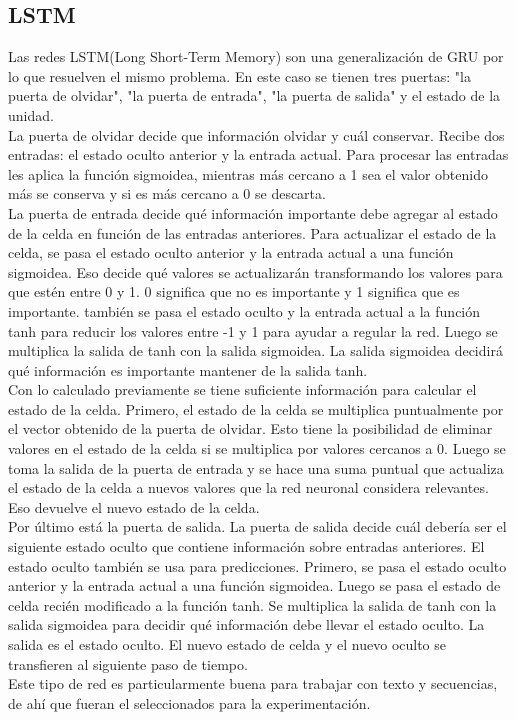 \subsection{LSTM}
Las redes LSTM(Long Short-Term Memory) son una generalización de GRU por lo que resuelven el mismo problema. En este caso se tienen tres puertas: "la puerta de olvidar", "la puerta de entrada", "la puerta de salida" y el estado de la unidad.\\
La puerta de olvidar decide que información olvidar y cuál conservar. Recibe dos entradas: el estado oculto anterior y la entrada actual. Para procesar las entradas les aplica la función sigmoidea, mientras más cercano a 1 sea el valor obtenido más se conserva y si es más cercano a 0 se descarta.\\
La puerta de entrada decide qué información importante debe agregar al estado de la celda en función de las entradas anteriores. Para actualizar el estado de la celda, se pasa el estado oculto anterior  y la entrada actual  a una función sigmoidea. Eso decide qué valores se actualizarán transformando los valores para que estén entre 0 y 1. 0 significa que no es importante y 1 significa que es importante. también se pasa el estado oculto y la entrada actual a la función tanh para reducir los valores entre -1 y 1 para ayudar a regular la red. Luego se multiplica la salida de tanh con la salida sigmoidea. La salida sigmoidea decidirá qué información es importante mantener de la salida tanh.\\
Con lo calculado previamente se tiene suficiente información para calcular el estado de la celda. Primero, el estado de la celda se multiplica puntualmente por el vector obtenido de la puerta de olvidar. Esto tiene la posibilidad de eliminar valores en el estado de la celda si se multiplica por valores cercanos a 0. Luego se toma la salida de la puerta de entrada y se hace una suma puntual que actualiza el estado de la celda a nuevos valores que la red neuronal considera relevantes. Eso devuelve el nuevo estado de la celda.\\
Por último está la puerta de salida. La puerta de salida decide cuál debería ser el siguiente estado oculto que contiene información sobre entradas anteriores. El estado oculto también se usa para predicciones. Primero, se pasa el estado oculto anterior y la entrada actual a una función sigmoidea. Luego se pasa el estado de celda recién modificado a la función tanh. Se multiplica la salida de tanh con la salida sigmoidea para decidir qué información debe llevar el estado oculto. La salida es el estado oculto. El nuevo estado de celda y el nuevo oculto se transfieren al siguiente paso de tiempo.\\
Este tipo de red es particularmente buena para trabajar con texto y secuencias, de ahí que fueran el seleccionados para la experimentación.